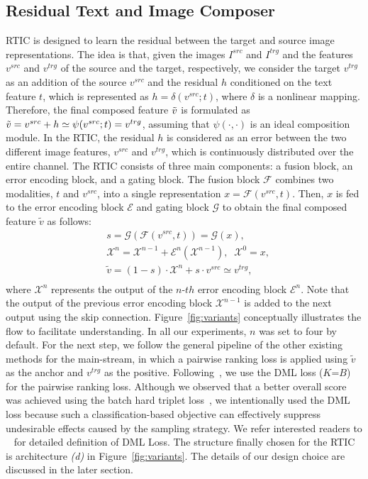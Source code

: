 \documentclass[10pt,twocolumn,letterpaper]{article}
\begin{document}
\subsection{Residual Text and Image Composer}
RTIC is designed to learn the residual between the target and source image representations. The idea is that, given the images $I^{src}$ and $I^{trg}$ and the features $v^{src}$ and $v^{trg}$ of the source and the target, respectively, we consider the target $v^{trg}$ as an addition of the source $v^{src}$ and the residual $h$ conditioned on the text feature $t$, which is represented as $h = \delta(v^{src}; t)$, where $\delta$ is a nonlinear mapping. Therefore, the final composed feature $\Tilde{v}$ is formulated as $\Tilde{v} = v^{src} + h \simeq \psi(v^{src}; t) = v^{trg}$, assuming that $\psi(\cdot, \cdot)$ is an ideal composition module. In the RTIC, the residual $h$ is considered as an error between the two different image features, $v^{src}$ and $v^{trg}$, which is continuously distributed over the entire channel. The RTIC consists of three main components: a fusion block, an error encoding block, and a gating block. The fusion block $\mathcal{F}$ combines two modalities, $t$ and $v^{src}$, into a single representation $x = \mathcal{F}(v^{src}, t)$. Then, $x$ is fed to the error encoding block $\mathcal{E}$ and gating block $\mathcal{G}$ to obtain the final composed feature $\tilde{v}$ as follows:
\begin{equation}
    \label{eq:rtic_eq}
    \begin{aligned}
        & s = \mathcal{G}(\mathcal{F}(v^{src}, t)) = \mathcal{G}(x), \\
        & \mathcal{X}^n = \mathcal{X}^{n-1} + \mathcal{E}^{n}(\mathcal{X}^{n-1}), \; \; \mathcal{X}^{0} = x, \\
        & \tilde{v} = (1-s) \cdot \mathcal{X}^n + s \cdot v^{src} \simeq v^{trg} , \\
    \end{aligned}
\end{equation}
where $\mathcal{X}^n$ represents the output of the $n$-$th$ error encoding block $\mathcal{E}^{n}$. Note that the output of the previous error encoding block $\mathcal{X}^{n-1}$ is added to the next output using the skip connection. Figure~\ref{fig:variants} conceptually illustrates the flow to facilitate understanding. In all our experiments, $n$ was set to four by default. For the next step, we follow the general pipeline of the other existing methods for the main-stream, in which a pairwise ranking loss is applied using $\tilde{v}$ as the anchor and $v^{trg}$ as the positive. Following~\cite{vo2019composing}, we use the DML loss ($K$=$B$) for the pairwise ranking loss. Although we observed that a better overall score was achieved using the batch hard triplet loss~\cite{hermans2017defense}, we intentionally used the DML loss because such a classification-based objective can effectively suppress undesirable effects caused by the sampling strategy. We refer interested readers to ~\cite{vo2019composing} for detailed definition of DML Loss. The structure finally chosen for the RTIC is architecture \textit{(d)} in Figure~\ref{fig:variants}. The details of our design choice are discussed in the later section.
\end{document}

